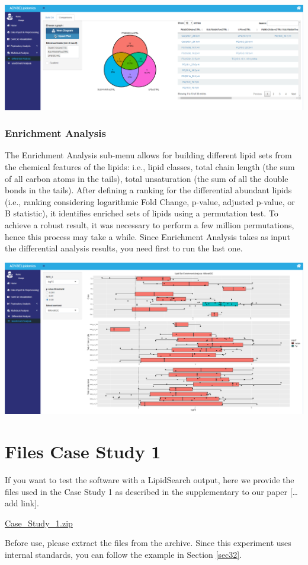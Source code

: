 \documentclass[
]{book}
\begin{document}
\includegraphics[width=1\linewidth]{images/venn}

\hypertarget{sec352}{%
\subsection{Enrichment Analysis}\label{sec352}}

The Enrichment Analysis sub-menu allows for building different lipid sets from the chemical features of the lipids: i.e., lipid classes, total chain length (the sum of all carbon atoms in the tails), total unsaturation (the sum of all the double bonds in the tails). After defining a ranking for the differential abundant lipids (i.e., ranking considering logarithmic Fold Change, p-value, adjusted p-value, or B statistic), it identifies enriched sets of lipids using a permutation test. To achieve a robust result, it was necessary to perform a few million permutations, hence this process may take a while. Since Enrichment Analysis takes as input the differential analysis results, you need first to run the last one.

\includegraphics[width=1\linewidth]{images/enrichment}

\hypertarget{filestudy}{%
\chapter{Files Case Study 1}\label{filestudy}}

If you want to test the software with a LipidSearch output, here we provide the files used in the Case Study 1 as described in the supplementary to our paper {[}\ldots add link{]}.

\href{https://github.com/ShinyFabio/ADViSELipidomics_book/raw/main/data_example/Case_Study_1.zip}{Case\_Study\_1.zip}

Before use, please extract the files from the archive. Since this experiment uses internal standards, you can follow the example in Section \ref{sec32}.

  
\end{document}
